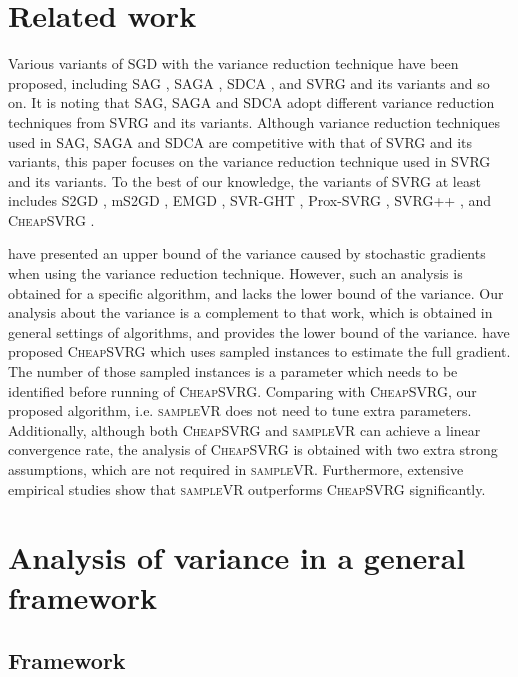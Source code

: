 \documentclass[letterpaper]{article}
\begin{document}
\section{Related work}
\label{sect_related_work}
Various variants of  SGD with the variance reduction technique have been proposed, including SAG \citep{Schmidt:2013ui}, SAGA \citep{Defazio:2014vu}, SDCA \citep{ShalevShwartz:2016vy}, and SVRG \citep{Johnson:9MAvkbgy} and its variants and so on. It is noting that SAG, SAGA and SDCA adopt different variance reduction techniques from SVRG and its variants. Although variance reduction techniques used in SAG, SAGA and SDCA are competitive with that of SVRG and its variants,  this paper focuses on the variance reduction technique used in SVRG and its variants. To the best of our knowledge,  the variants of SVRG at least includes S2GD \citep{Richtarik:2013te}, mS2GD \citep{Liu:2015bx}, EMGD \citep{Zhang2013Linear}, SVR-GHT \citep{Li:2016vh}, Prox-SVRG \citep{Xiao:2014vw}, SVRG++ \citep{Allen2015Improved}, and \textsc{CheapSVRG} \citep{Shah2016Trading}. 

\citet{AllenZhu:2016up} have presented an upper bound of the variance caused by stochastic gradients when using the variance reduction technique. However, such an analysis is obtained for a specific algorithm, and lacks the lower bound of the variance.    Our analysis about the variance is a complement to that work, which is obtained in general settings of algorithms, and provides  the lower bound of the variance. \citet{Shah2016Trading} have proposed \textsc{CheapSVRG} which uses sampled instances to estimate the full gradient. The number of those sampled instances is a parameter which needs to be identified before running of \textsc{CheapSVRG}. Comparing with \textsc{CheapSVRG}, our proposed algorithm, i.e. \textsc{sampleVR} does not need to tune extra parameters. Additionally, although both \textsc{CheapSVRG} and \textsc{sampleVR} can achieve a linear convergence rate, the analysis of \textsc{CheapSVRG} is obtained with two extra strong assumptions, which are not required in \textsc{sampleVR}. Furthermore, extensive empirical studies show that  \textsc{sampleVR} outperforms \textsc{CheapSVRG} significantly.
 

\section{Analysis of variance in a  general framework}
\label{sect_framework}
\subsection{Framework}
\end{document}
